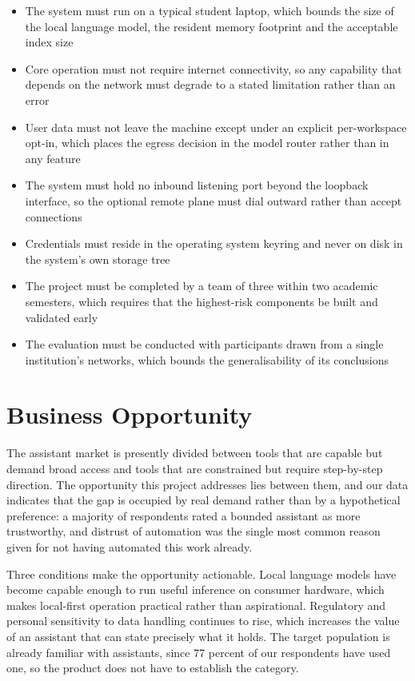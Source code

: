 \documentclass{FastFyp}
\begin{document}
\begin{itemize}
    \item The system must run on a typical student laptop, which bounds the size of the local language model, the resident memory footprint and the acceptable index size
    \item Core operation must not require internet connectivity, so any capability that depends on the network must degrade to a stated limitation rather than an error
    \item User data must not leave the machine except under an explicit per-workspace opt-in, which places the egress decision in the model router rather than in any feature
    \item The system must hold no inbound listening port beyond the loopback interface, so the optional remote plane must dial outward rather than accept connections
    \item Credentials must reside in the operating system keyring and never on disk in the system's own storage tree
    \item The project must be completed by a team of three within two academic semesters, which requires that the highest-risk components be built and validated early
    \item The evaluation must be conducted with participants drawn from a single institution's networks, which bounds the generalisability of its conclusions
\end{itemize}

\section{Business Opportunity}
The assistant market is presently divided between tools that are capable but demand broad access and tools that are constrained but require step-by-step direction. The opportunity this project addresses lies between them, and our data indicates that the gap is occupied by real demand rather than by a hypothetical preference: a majority of respondents rated a bounded assistant as more trustworthy, and distrust of automation was the single most common reason given for not having automated this work already.

Three conditions make the opportunity actionable. Local language models have become capable enough to run useful inference on consumer hardware, which makes local-first operation practical rather than aspirational. Regulatory and personal sensitivity to data handling continues to rise, which increases the value of an assistant that can state precisely what it holds. The target population is already familiar with assistants, since 77 percent of our respondents have used one, so the product does not have to establish the category.
\end{document}
